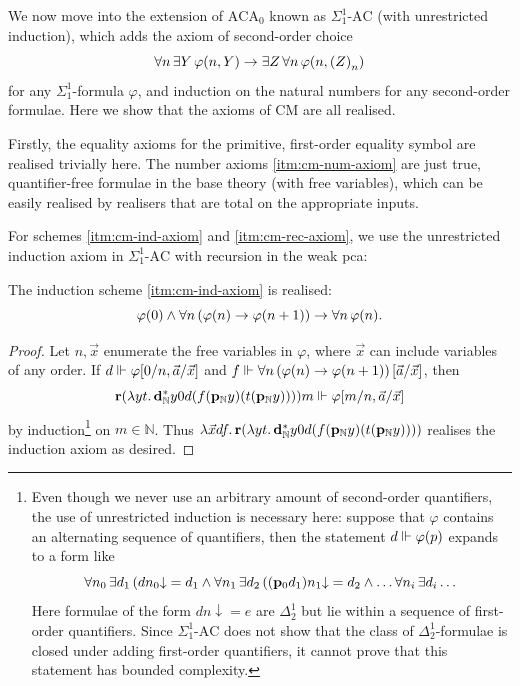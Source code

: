 \documentclass[12pt,openany]{book}
\theoremstyle{plain}
\theoremstyle{definition}
\newcommand\opA[1]{\mathop{\forall #1}}
\newcommand\opE[1]{\mathop{\exists #1}}
\newcommand\oplam[1]{\mathop{\lambda #1.}}
\newcommand\ACA{\mathrm{ACA}}
\newcommand\AC{\text{-}\mathrm{AC}}
\newcommand\CM{\mathrm{CM}}
\newcommand\bp{\mathbf{p}}
\newcommand\br{\mathbf{r}}
\newcommand\bpN{\mathbf{p}_\mathbb{N}}
\newcommand\bdN{\mathbf{d}_\mathbb{N}}
\begin{document}
We now move into the extension of $\ACA_0$ known as $\Sigma^1_1\AC$ (with unrestricted induction), which adds the axiom of second-order choice
\[\opA{n} \opE{Y} \varphi\mleft(n, Y\mright) \rightarrow \opE{Z} \opA{n} \varphi\mleft(n, \left(Z\right)_n\mright)\]
for any $\Sigma^1_1$-formula $\varphi$, and induction on the natural numbers for any second-order formulae. Here we show that the axioms of $\CM$ are all realised.

Firstly, the equality axioms for the primitive, first-order equality symbol are realised trivially here. The number axioms \ref{itm:cm-num-axiom} are just true, quantifier-free formulae in the base theory (with free variables), which can be easily realised by realisers that are total on the appropriate inputs.

For schemes \ref{itm:cm-ind-axiom} and \ref{itm:cm-rec-axiom}, we use the unrestricted induction axiom in $\Sigma^1_1\AC$ with recursion in the weak pca:
\begin{lemma}
  The induction scheme \ref{itm:cm-ind-axiom} is realised:
  \[\varphi\mleft(0\mright) \land \opA{n} \left(\varphi\mleft(n\mright) \rightarrow \varphi\mleft(n + 1\mright)\right) \rightarrow \opA{n} \varphi\mleft(n\mright).\]
\end{lemma}

\begin{proof}
  Let $n, \vec{x}$ enumerate the free variables in $\varphi$, where $\vec{x}$ can include variables of any order. If $d \Vdash \varphi\mleft[0/n, \vec{a}/\vec{x}\mright]$ and $f \Vdash \opA{n} \left(\varphi\mleft(n\mright) \rightarrow \varphi\mleft(n + 1\mright)\right)\mleft[\vec{a}/\vec{x}\mright]$, then
  \[\br \mleft(\oplam{yt} \bdN^* y0d \mleft(f \mleft(\bpN y\mright) \mleft(t \mleft(\bpN y\mright)\mright)\mright)\mright) m \Vdash \varphi\mleft[m/n, \vec{a}/\vec{x}\mright]\]
  by induction\footnote{\label{ftn:cm-real-complex}Even though we never use an arbitrary amount of second-order quantifiers, the use of unrestricted induction is necessary here: suppose that $\varphi$ contains an alternating sequence of quantifiers, then the statement $d \Vdash \varphi\mleft(p\mright)$ expands to a form like
  \[\opA{n_0} \opE{d_1} \left(d n_0 {\downarrow} = d_1 \land \opA{n_1} \opE{d_2} \left(\mleft(\bp_0 d_1\mright) n_1 {\downarrow} = d_2 \land \ldots \opA{n_i} \opE{d_i} \ldots \right.\right.\]
  Here formulae of the form $dn {\downarrow} = e$ are $\Delta^1_2$ but lie within a sequence of first-order quantifiers. Since $\Sigma^1_1\AC$ does not show that the class of $\Delta^1_2$-formulae is closed under adding first-order quantifiers, it cannot prove that this statement has bounded complexity.} on $m \in \mathbb{N}$. Thus $\oplam{\vec{x} df} \br \mleft(\oplam{yt} \bdN^* y0d \mleft(f \mleft(\bpN y\mright) \mleft(t \mleft(\bpN y\mright)\mright)\mright)\mright)$ realises the induction axiom as desired.
\end{proof}
\end{document}

